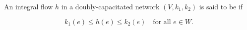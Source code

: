 An integral flow $h$ in a doubly-capacitated network $(V, k_1, k_2)$ is said to be  if

$$k_1(e) \leq h(e) \leq k_2(e) \quad \text{for all } e \in W.$$
